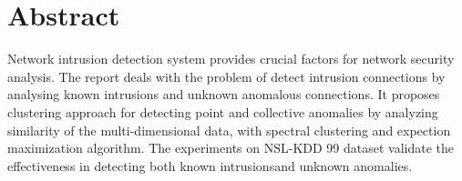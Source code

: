 \section{Abstract}
Network intrusion detection system provides crucial factors for network security analysis.
The report deals with the problem of detect intrusion connections by analysing known intrusions and unknown anomalous connections.
It proposes clustering approach for detecting point and collective anomalies by analyzing similarity of the multi-dimensional data, with spectral clustering and expection maximization algorithm.
The experiments on NSL-KDD 99 dataset validate the effectiveness in detecting both known intrusionsand unknown anomalies.

